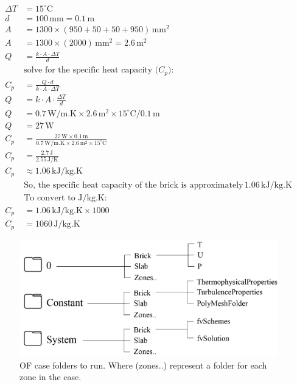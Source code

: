 \begin{equation}
\begin{aligned}
\Delta T &= 15^\circ \text{C} \\
d &= 100 \, \text{mm} = 0.1 \, \text{m} \\
A &= 1300 \times (950 + 50 + 50 + 950) \, \text{mm}^2 \\
A &= 1300 \times (2000) \, \text{mm}^2 = 2.6 \, \text{m}^2 \\
Q &= \frac{k \cdot A \cdot \Delta T}{d} \\
&\text{solve for the specific heat capacity ($C_p$):} \\
C_p &= \frac{Q \cdot d}{k \cdot A \cdot \Delta T} \\
Q &= k \cdot A \cdot \frac{\Delta T}{d} \\
Q &= 0.7 \, \text{W/m.K} \times 2.6 \, \text{m}^2 \times 15^\circ \text{C} / 0.1 \, \text{m} \\
Q &= 27 \, \text{W} \\
C_p &= \frac{27 \, \text{W} \times 0.1 \, \text{m}}{0.7 \, \text{W/m.K} \times 2.6 \, \text{m}^2 \times 15^\circ \text{C}} \\
C_p &= \frac{2.7 \, \text{J}}{2.55 \, \text{J/K}} \\
C_p &\approx 1.06 \, \text{kJ/kg.K} \\
&\text{So, the specific heat capacity of the brick is approximately} \, 1.06 \, \text{kJ/kg.K} \\
&\text{To convert to J/kg.K:} \\
C_p &= 1.06 \, \text{kJ/kg.K} \times 1000 \\
C_p &= 1060 \, \text{J/kg.K}
\end{aligned}
\end{equation}








\begin{figure}[tbh]
\centering
\includegraphics[width=0.77\columnwidth]{Figures/constc.png}
\hspace{0.7cm}
\caption[OF Case Contents]{OF case folders to run. Where (zones..) represent a folder for each zone in the case.}
\label{constc}
\end{figure}


